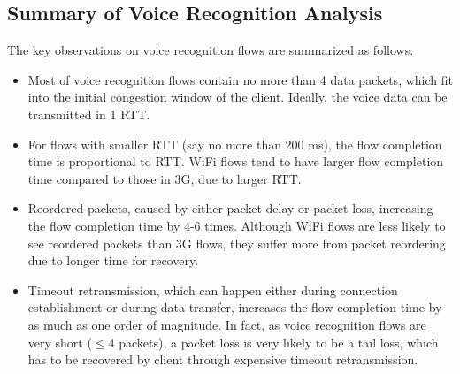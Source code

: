 \subsection{Summary of Voice Recognition Analysis}

The key observations on voice recognition flows are summarized as follows:
\begin{itemize}
\item Most of voice recognition flows contain no more than 4 data packets, which fit into the initial congestion window of the client. Ideally, the voice data can be transmitted in 1 RTT.
\item For flows with smaller RTT (say no more than 200 ms), the flow completion time is proportional to RTT. WiFi flows tend to have larger flow completion time compared to those in 3G, due to larger RTT. 	
\item Reordered packets, caused by either packet delay or packet loss, increasing the flow completion time by 4-6 times. Although WiFi flows are less likely to see reordered packets than 3G flows, they suffer more from packet reordering due to longer time for recovery.
\item Timeout retransmission, which can happen either during connection establishment or during data transfer, increases the flow completion time by as much as one order of magnitude. In fact, as voice recognition flows are very short ($\le$4 packets), a packet loss is very likely to be a tail loss, which has to be recovered by client through expensive timeout retransmission. %

\end{itemize}
